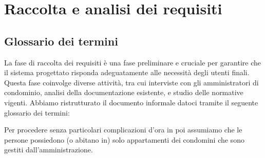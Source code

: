 \section{Raccolta e analisi dei requisiti}
\label{requisiti}

\subsection{Glossario dei termini}

La fase di raccolta dei requisiti è una fase preliminare e  cruciale per garantire che il sistema progettato risponda adeguatamente alle necessità degli utenti finali. Questa fase coinvolge diverse attività, tra cui interviste con gli amministratori di condominio, analisi della documentazione esistente, e studio delle normative vigenti. Abbiamo ristrutturato il documento informale datoci tramite il seguente glossario dei termini:

\begin{table}[htbp]
    \centering
    
\end{table}

Per procedere senza particolari complicazioni d'ora in poi assumiamo che le persone possiedono (o abitano in) solo appartamenti dei condomini che sono gestiti dall'amministrazione.
